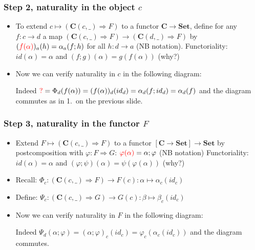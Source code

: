 \documentclass[handout]{beamer}
\newcommand{\To}{\Rightarrow}
\newcommand{\bfsf}[1]{{\boldsymbol{#1}}}
\newcommand{\Set}{\bfsf{Set}}
\newcommand{\CC}{\bfsf{C}}
\begin{document}
\frame
  {   
    \frametitle{Step 2, naturality in the object $c$}\label{Yon:natural_in_c}

 \begin{itemize}[<+->]
\item To extend $c\mapsto(\CC(c,\_)\To F)$ to a functor $\CC\to\Set$, define
for any $f:c\to d$ a map $(\CC(c,\_)\To F)\to(\CC(d,\_)\To F)$ by
$({\color{red}f(\alpha)})_a (h) = \alpha_a(f;h)$ for all $h:d\to a$ (NB {\color{red}notation}).
Functoriality: $id(\alpha) = \alpha$ and $(f;g)(\alpha) = g(f(\alpha))$ (why?)
\item Now we can verify naturality in $c$ in the following diagram:

Indeed ${\color{red} ?}=\Phi_d(f(\alpha)) = (f(\alpha))_d(id_d) = \alpha_d(f;id_d) = \alpha_d(f)$
and the diagram commutes as in 1.\ on the previous slide.
 \end{itemize}

 }

\frame
  {   
    \frametitle{Step 3, naturality in the functor $F$}\label{Yon:natural_in_F}

 \begin{itemize}[<+->]
\item Extend $F\mapsto(\CC(c,\_)\To F)$ to a functor $[\CC\to\Set]\to\Set$
by postcomposition with $\varphi:F\To G$: 
${\color{red}\varphi(\alpha)} = \alpha;\varphi$ (NB {\color{red}notation})
Functoriality: 
$id(\alpha) = \alpha$ and $(\varphi;\psi)(\alpha) = \psi(\varphi(\alpha))$ (why?)
\item Recall: $\Phi_c : (\CC(c,\_)\To F) \to F(c): \alpha\mapsto \alpha_c(id_c)$
\item Define: $\Psi_c : (\CC(c,\_)\To G) \to G(c): \beta\mapsto \beta_c(id_c)$
\item Now we can verify naturality in $F$ in the following diagram:

Indeed $\Psi_d(\alpha;\varphi) = (\alpha;\varphi)_c(id_c) = \varphi_c(\alpha_c(id_c))$
and the diagram commutes.
 \end{itemize}

 }
\end{document}
